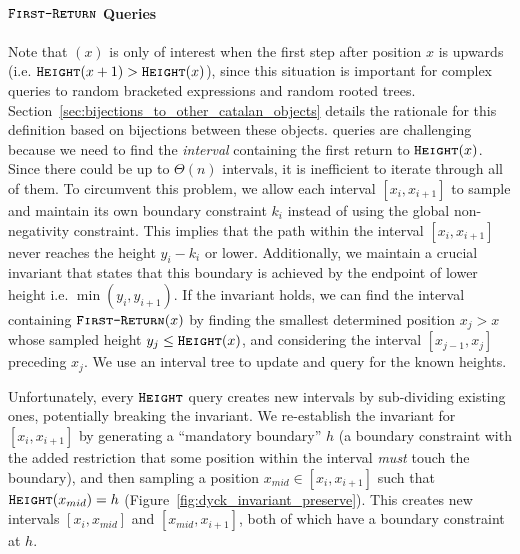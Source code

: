 \paragraph*{$\texttt{\textsc{First-Return}}$ Queries}
\label{par:_first-return_queries}
Note that $(x)$ is only of interest when the first step after position $x$ is upwards (i.e. $\texttt{\textsc{Height}}(x+1)>\texttt{\textsc{Height}}(x)$),
since this situation is important for complex queries to random bracketed expressions and random rooted trees.
Section~\ref{sec:bijections_to_other_catalan_objects} details the rationale for this definition based on bijections between these objects.
 queries are challenging because we need to find the \emph{interval} containing the first return to $\texttt{\textsc{Height}}(x)$.
Since there could be up to $\Theta(n)$ intervals, it is inefficient to iterate through all of them.
To circumvent this problem, we allow each interval $[x_i,x_{i+1}]$ to sample and maintain its own boundary constraint $k_i$
instead of using the global non-negativity constraint.
This implies that the path within the interval $[x_i,x_{i+1}]$ never reaches the height $y_i-k_i$ or lower.
Additionally, we maintain a crucial invariant that states that this boundary is achieved by the endpoint of lower height i.e. $\min(y_i,y_{i+1})$.
If the invariant holds, we can find the interval containing $\texttt{\textsc{First-Return}}(x)$ by finding the smallest determined position $x_j>x$
whose sampled height $y_j \le \texttt{\textsc{Height}}(x)$, and considering the interval $[x_{j-1},x_j]$ preceding $x_j$.
We use an interval tree to update and query for the known heights.

Unfortunately, every $\texttt{\textsc{Height}}$ query creates new intervals by sub-dividing existing ones, potentially breaking the invariant.
We re-establish the invariant for $[x_i,x_{i+1}]$ by generating a ``mandatory boundary'' $h$
(a boundary constraint with the added restriction that some position within the interval \emph{must} touch the boundary),
and then sampling a position $x_{mid}\in [x_i,x_{i+1}]$ such that $\texttt{\textsc{Height}}(x_{mid}) = h$ (Figure~\ref{fig:dyck_invariant_preserve}).
This creates new intervals $[x_i,x_{mid}]$ and $[x_{mid},x_{i+1}]$, both of which have a boundary constraint at $h$.

